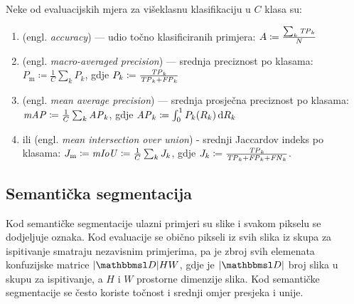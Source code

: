 \documentclass[utf8, diplomski, lmodern]{fer}
\begin{document}

Neke od evaluacijskih mjera za višeklasnu klasifikaciju u $C$ klasa su:
\begin{enumerate}[topsep=0pt,itemsep=0pt,partopsep=0pt]
	\item {} (engl. \textit{accuracy}) --- udio točno klasificiranih primjera: $A\coloneqq\frac{\sum_k \mathit{TP}_k}{N}$
	\item {} (engl. \textit{macro-averaged precision}) --- srednja preciznost po klasama: $P_\text{m}\coloneqq\frac{1}{C}\sum_k P_k$, gdje $P_k\coloneqq\frac{\mathit{TP}_k}{\mathit{TP}_k+\mathit{FP}_k}$
	\item {} (engl. \textit{mean average precision}) --- srednja prosječna preciznost po klasama: $\mathit{mAP}\coloneqq\frac{1}{C}\sum_k \mathit{AP}_k$, gdje $\mathit{AP}_k\coloneqq\int_0^1 P_k(R_k)\mathop{}\!\mathrm{d} R_k$
	\item {} ili  (engl. \textit{mean intersection over union}) - srednji Jaccardov indeks po klasama: $J_\text{m}\coloneqq\mathit{mIoU}\coloneqq\frac{1}{C}\sum_k J_k$, gdje $J_k\coloneqq\frac{\mathit{TP}_k}{\mathit{TP}_k+\mathit{FP}_k+\mathit{FN}_k}$.
\end{enumerate}


\subsection{Semantička segmentacija}

Kod semantičke segmentacije ulazni primjeri su slike i svakom pikselu se dodjeljuje oznaka. Kod evaluacije se obično pikseli iz svih slika iz skupa za ispitivanje smatraju nezavisnim primjerima, pa je zbroj svih elemenata konfuzijske matrice $\envert{\set D}HW$, gdje je $\envert{\set D}$ broj slika u skupu za ispitivanje, a $H$ i $W$ prostorne dimenzije slika. Kod semantičke segmentacije se često koriste točnost i srednji omjer presjeka i unije.
\end{document}
